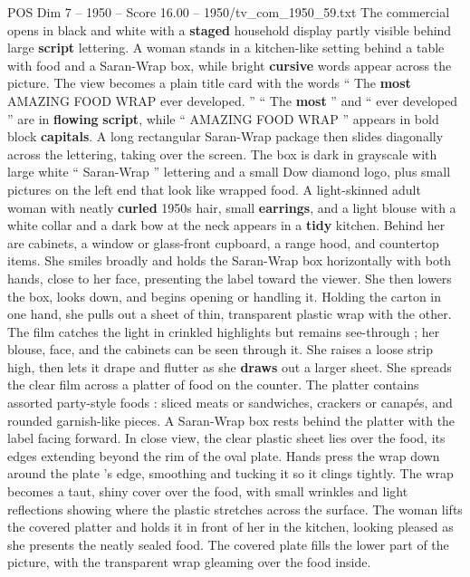 \begin{textsample}{POS Dim 7 – 1950 – Score 16.00 – 1950/tv\_com\_1950\_59.txt}  \label{ex:f7_pos_009}
The commercial opens in black and white with a \textbf{staged} household display partly visible behind large \textbf{script} lettering.
A woman stands in a kitchen-like setting behind a table with food and a Saran-Wrap box, while bright \textbf{cursive} words appear across the picture.
The view becomes a plain title card with the words “ The \textbf{most} AMAZING FOOD WRAP ever developed. ” “ The \textbf{most} ” and “ ever developed ” are in \textbf{flowing} \textbf{script}, while “ AMAZING FOOD WRAP ” appears in bold block \textbf{capitals}.
A long rectangular Saran-Wrap package then slides diagonally across the lettering, taking over the screen.
The box is dark in grayscale with large white “ Saran-Wrap ” lettering and a small Dow diamond logo, plus small pictures on the left end that look like wrapped food.
A light-skinned adult woman with neatly \textbf{curled} 1950s hair, small \textbf{earrings}, and a light blouse with a white collar and a dark bow at the neck appears in a \textbf{tidy} kitchen.
Behind her are cabinets, a window or glass-front cupboard, a range hood, and countertop items.
She smiles broadly and holds the Saran-Wrap box horizontally with both hands, close to her face, presenting the label toward the viewer.
She then lowers the box, looks down, and begins opening or handling it.
Holding the carton in one hand, she pulls out a sheet of thin, transparent plastic wrap with the other.
The film catches the light in crinkled highlights but remains see-through ; her blouse, face, and the cabinets can be seen through it.
She raises a loose strip high, then lets it drape and flutter as she \textbf{draws} out a larger sheet.
She spreads the clear film across a platter of food on the counter.
The platter contains assorted party-style foods : sliced meats or sandwiches, crackers or canapés, and rounded garnish-like pieces.
A Saran-Wrap box rests behind the platter with the label facing forward.
In close view, the clear plastic sheet lies over the food, its edges extending beyond the rim of the oval plate.
Hands press the wrap down around the plate ’s edge, smoothing and tucking it so it clings tightly.
The wrap becomes a taut, shiny cover over the food, with small wrinkles and light reflections showing where the plastic stretches across the surface.
The woman lifts the covered platter and holds it in front of her in the kitchen, looking pleased as she presents the neatly sealed food.
The covered plate fills the lower part of the picture, with the transparent wrap gleaming over the food inside.

\end{textsample}
